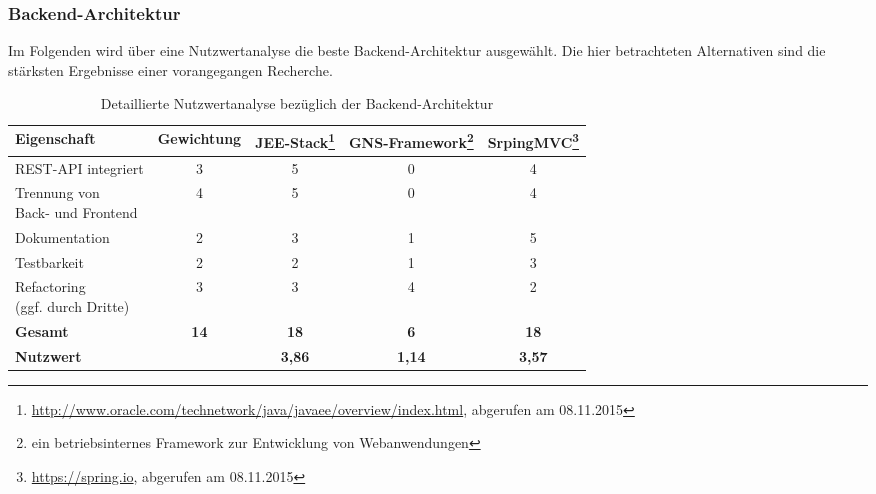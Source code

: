 \label{app:nutzwertanalyse}

\subsubsection{Backend-Architektur}

Im Folgenden wird über eine Nutzwertanalyse die beste Backend-Architektur ausgewählt.
Die hier betrachteten Alternativen sind die stärksten Ergebnisse einer vorangegangen Recherche. 

\begin{savenotes}
\begin{table}[H]
	\centering
	\begin{tabular}{lcccc}

		\rowcolor{white!15}				
		\textbf{Eigenschaft} 			& \textbf{Gewichtung}
			& \textbf{JEE-Stack\footnote{\url{http://www.oracle.com/technetwork/java/javaee/overview/index.html}, abgerufen am 08.11.2015}}
			& \textbf{GNS-Framework\footnote{ein betriebsinternes Framework zur Entwicklung von Webanwendungen}}
			& \textbf{SrpingMVC\footnote{\url{https://spring.io}, abgerufen am 08.11.2015}} \\\hline		
		
		REST-API integriert				& 3						& 5						& 0							& 4 \\
		\pbox{4cm}{Trennung von \\ Back- und Frontend}	& 4						& 5						& 0							& 4 \\						
		Dokumentation					& 2						& 3						& 1							& 5 \\
		Testbarkeit						& 2						& 2						& 1							& 3 \\
		\pbox{4cm}{Refactoring \\(ggf. durch Dritte)}	& 3						& 3						& 4							& 2 \\
		
		\rowcolor{MidnightBlue!15}
		\textbf{Gesamt}				& \textbf{14}			& \textbf{18}			& \textbf{6}				& \textbf{18} \\\hline
		\rowcolor{white!15}				
		\textbf{Nutzwert} 				& 						& \textbf{3,86}			& \textbf{1,14} 			& \textbf{3,57} \\
											
			    
	\end{tabular}
	
	\caption{Detaillierte Nutzwertanalyse bezüglich der Backend-Architektur}
	\label{tab:nutzwertanalyse_backend}
\end{table}
\end{savenotes}


